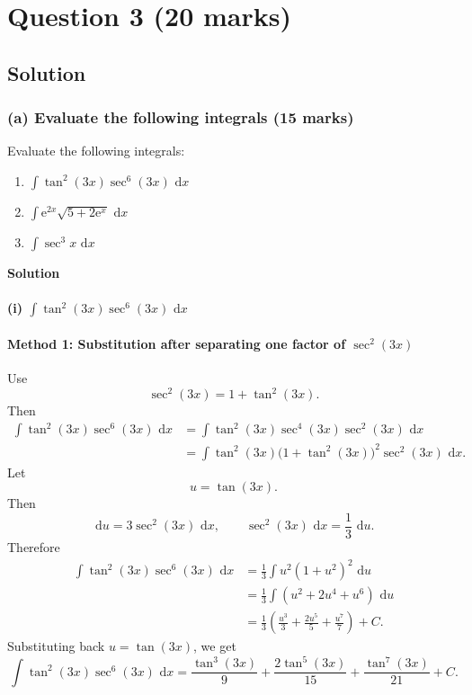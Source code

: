 \documentclass[12pt]{article}
\newcommand{\dd}{\,\mathrm{d}}
\newcommand{\ee}{\mathrm{e}}
\begin{document}
\newpage
\section[Question 3 (20 marks)]{Question 3 \hfill (20 marks)}

\subsection{Solution}

\subsubsection{(a) Evaluate the following integrals \hfill (15 marks)}

Evaluate the following integrals:
\begin{enumerate}[label=(\roman*)]
  \item \(\displaystyle \int \tan^2(3x)\sec^6(3x)\,\dd x\)
  \item \(\displaystyle \int \ee^{2x}\sqrt{5+2\ee^x}\,\dd x\)
  \item \(\displaystyle \int \sec^3 x\,\dd x\)
\end{enumerate}

\textbf{Solution}

\paragraph{(i) \(\displaystyle \int \tan^2(3x)\sec^6(3x)\,\dd x\)}

\paragraph{Method 1: Substitution after separating one factor of \(\sec^2(3x)\)}
Use
\[
\sec^2(3x)=1+\tan^2(3x).
\]
Then
\begin{align*}
\int \tan^2(3x)\sec^6(3x)\,\dd x
&=\int \tan^2(3x)\sec^4(3x)\sec^2(3x)\,\dd x \\
&=\int \tan^2(3x)\bigl(1+\tan^2(3x)\bigr)^2\sec^2(3x)\,\dd x.
\end{align*}
Let
\[
u=\tan(3x).
\]
Then
\[
\dd u=3\sec^2(3x)\,\dd x,
\qquad
\sec^2(3x)\,\dd x=\frac{1}{3}\,\dd u.
\]
Therefore
\begin{align*}
\int \tan^2(3x)\sec^6(3x)\,\dd x
&=\frac{1}{3}\int u^2(1+u^2)^2\,\dd u \\
&=\frac{1}{3}\int (u^2+2u^4+u^6)\,\dd u \\
&=\frac{1}{3}\left(\frac{u^3}{3}+\frac{2u^5}{5}+\frac{u^7}{7}\right)+C.
\end{align*}
Substituting back \(u=\tan(3x)\), we get
\[
\boxed{\int \tan^2(3x)\sec^6(3x)\,\dd x
=\frac{\tan^3(3x)}{9}+\frac{2\tan^5(3x)}{15}+\frac{\tan^7(3x)}{21}+C.}
\]
\end{document}
